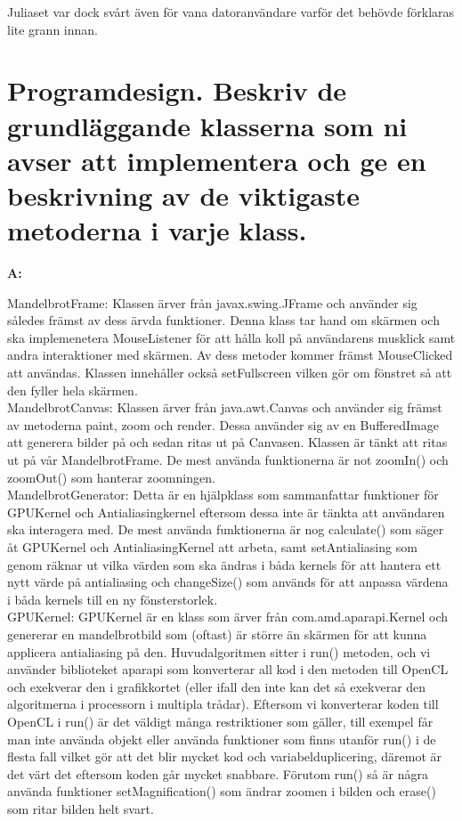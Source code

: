 \documentclass[11pt]{article} %
\begin{document}
Juliaset var dock svårt även för vana datoranvändare varför det behövde förklaras lite grann innan.

\section{Programdesign. Beskriv de grundläggande klasserna som ni avser att implementera och ge en beskrivning av de viktigaste metoderna i varje klass.}

{\bf A:}

MandelbrotFrame: Klassen ärver från javax.swing.JFrame och använder sig således främst av dess ärvda funktioner. Denna klass tar hand om skärmen och ska implemenetera MouseListener för att hålla koll på användarens musklick samt andra interaktioner med skärmen. Av dess metoder kommer främst MouseClicked att användas. Klassen innehåller också setFullscreen vilken gör om fönstret så att den fyller hela skärmen. \\

MandelbrotCanvas: Klassen ärver från java.awt.Canvas och använder sig främst av metoderna paint, zoom och render. Dessa använder sig av en BufferedImage att generera bilder på och sedan ritas ut på Canvasen. Klassen är tänkt att ritas ut på vår MandelbrotFrame. De mest använda funktionerna är not zoomIn() och zoomOut() som hanterar zoomningen. \\

MandelbrotGenerator: Detta är en hjälpklass som sammanfattar funktioner för GPUKernel och Antialiasingkernel eftersom dessa inte är tänkta att användaren ska interagera med. De mest använda funktionerna är nog calculate() som säger åt GPUKernel och AntialiasingKernel att arbeta, samt setAntialiasing som genom räknar ut vilka värden som ska ändras i båda kernels för att hantera ett nytt värde på antialiasing och changeSize() som används för att anpassa värdena i båda kernels till en ny fönsterstorlek. \\

GPUKernel: GPUKernel är en klass som ärver från com.amd.aparapi.Kernel och genererar en mandelbrotbild som (oftast) är större än skärmen för att kunna applicera antialiasing på den. Huvudalgoritmen sitter i run() metoden, och vi använder biblioteket aparapi som konverterar all kod i den metoden till OpenCL och exekverar den i grafikkortet (eller ifall den inte kan det så exekverar den algoritmerna i processorn i multipla trådar). Eftersom vi konverterar koden till OpenCL i run() är det väldigt många restriktioner som gäller, till exempel får man inte använda objekt eller använda funktioner som finns utanför run() i de flesta fall vilket gör att det blir mycket kod och variabelduplicering, däremot är det värt det eftersom koden går mycket snabbare. Förutom run() så är några använda funktioner setMagnification() som ändrar zoomen i bilden och erase() som ritar bilden helt svart. \\
\end{document}
